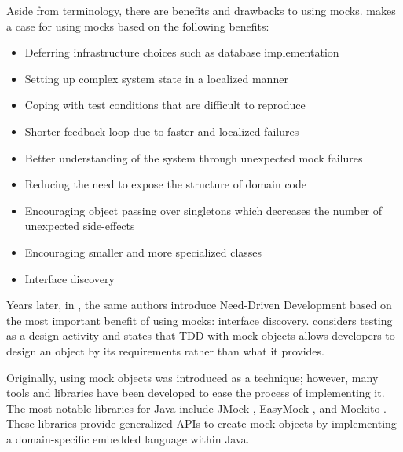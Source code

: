 \documentclass[conference]{IEEEtran}
\begin{document}
Aside from terminology, there are benefits and drawbacks to using mocks. 
\cite{endotesting} makes a case for using mocks based on the following benefits:
\begin{itemize}
    \item Deferring infrastructure choices such as database implementation
    \item Setting up complex system state in a localized manner
    \item Coping with test conditions that are difficult to reproduce
    \item Shorter feedback loop due to faster and localized failures
    \item Better understanding of the system through unexpected mock failures
    \item Reducing the need to expose the structure of domain code
    \item Encouraging object passing over singletons which decreases the number of unexpected side-effects
    \item Encouraging smaller and more specialized classes
    \item Interface discovery
\end{itemize}

Years later, in \cite{mockroles}, the same authors introduce Need-Driven Development based on the most important benefit of using mocks: interface discovery. \cite{mockroles} considers testing as a design activity and states that TDD with mock objects allows developers to design an object by its requirements rather than what it provides. 

Originally, using mock objects was introduced as a technique; however, many tools and libraries have been developed to ease the process of implementing it. The most notable libraries for Java include JMock \cite{mockroles}, EasyMock \cite{easymock}, and Mockito \cite{mockito}. These libraries provide generalized APIs to create mock objects by implementing a domain-specific embedded language within Java. 


\end{document}
